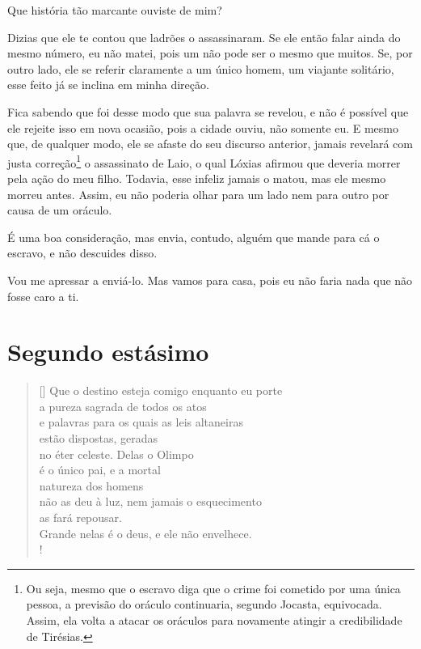    Que história tão marcante ouviste de mim?

   Dizias que ele te contou que ladrões o assassinaram. Se ele então falar
ainda do mesmo número, eu não matei, pois um não pode ser o mesmo que
muitos. Se, por outro lado, ele se referir claramente a um único homem,
um viajante solitário, esse feito já se inclina em minha direção.

   Fica sabendo que foi desse modo que sua palavra se revelou, e não é
possível que ele rejeite isso em nova ocasião, pois a cidade
ouviu, não somente eu. E mesmo que, de qualquer modo, ele se afaste do
seu discurso anterior, jamais revelará com justa correção\footnote{Ou
  seja, mesmo que o escravo diga que o crime foi cometido por uma única
  pessoa, a previsão do oráculo continuaria, segundo Jocasta,
  equivocada. Assim, ela volta a atacar os oráculos para novamente
  atingir a credibilidade de Tirésias.} o assassinato de Laio, o qual
Lóxias afirmou que deveria morrer pela ação do meu filho. Todavia, esse
infeliz jamais o matou, mas ele mesmo morreu antes. Assim, eu não
poderia olhar para um lado nem para outro por causa de um oráculo.

   É uma boa consideração, mas envia, contudo, alguém que mande para cá o
 escravo, e não descuides disso.

   Vou me apressar a enviá-lo. Mas vamos para casa, pois eu não faria nada
que não fosse caro a ti.


\section{Segundo estásimo}



\settowidth{\versewidth}{Que o destino esteja comigo enquanto eu portexx}
\begin{verse}[\versewidth]
Que o destino esteja comigo enquanto eu porte\\ 
a pureza sagrada de todos os atos\\
e palavras para os quais as leis altaneiras\\
estão dispostas, geradas\\
no éter celeste. Delas o Olimpo\\
é o único pai, e a mortal\\
natureza dos homens\\
não as deu à luz, nem jamais o esquecimento\\
as fará repousar.\\
Grande nelas é o deus, e ele não envelhece.\\!
\end{verse}

